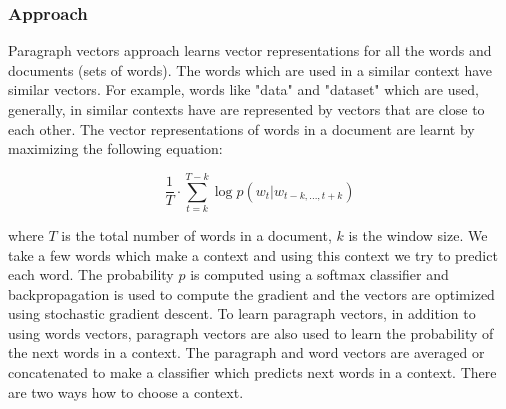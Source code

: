 \subsubsection{Approach}
Paragraph vectors approach learns vector representations for all the words and documents (sets of words). The words which are used in a similar context have similar vectors. For example, words like "data" and "dataset" which are used, generally, in similar contexts have are represented by vectors that are close to each other. The vector representations of words in a document are learnt by maximizing the following equation:

\begin{equation}
\frac{1}{T} \cdot \sum_{t=k}^{T-k} \log p(w_t|w_{t-k,...,t+k})
\end{equation}

where $T$ is the total number of words in a document, $k$ is the window size. We take a few words which make a context and using this context we try to predict each word. The probability $p$ is computed using a softmax classifier and backpropagation is used to compute the gradient and the vectors are optimized using stochastic gradient descent. To learn paragraph vectors, in addition to using words vectors, paragraph vectors are also used to learn the probability of the next words in a context. The paragraph and word vectors are averaged or concatenated to make a classifier which predicts next words in a context. There are two ways how to choose a context.

